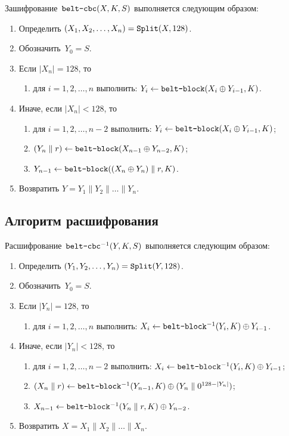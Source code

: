 Зашифрование~$\texttt{belt-cbc}(X,K,S)$ выполняется следующим образом: 
\begin{enumerate}
\item
Определить $(X_1,X_2,\ldots,X_n)=\mathop{\texttt{Split}}\nolimits(X,128)$.
\item
Обозначить~$Y_0=S$.
\item
Если $|X_n|=128$, то
\begin{enumerate}
\item
для $i=1,2,\ldots,n$ выполнить: 
$Y_i\leftarrow \texttt{belt-block}(X_i\oplus Y_{i-1},K)$.
\end{enumerate}
\item
Иначе, если $|X_n|<128$, то
\begin{enumerate}
\item
для $i=1,2,\ldots,n-2$ выполнить: 
$Y_i\leftarrow \texttt{belt-block}(X_i\oplus Y_{i-1},K)$;
\item
$(Y_n\parallel r)\leftarrow \texttt{belt-block}(X_{n-1}\oplus Y_{n-2},K)$;
\item
$Y_{n-1}\leftarrow \texttt{belt-block}((X_n\oplus Y_n)\parallel r,K)$.
\end{enumerate}
\item
Возвратить
$Y=Y_1\parallel Y_2\parallel\ldots\parallel Y_n$.
\end{enumerate}

\subsection{Алгоритм расшифрования}

Расшифрование~$\texttt{belt-cbc}^{-1}(Y,K,S)$ выполняется следующим образом: 
\begin{enumerate}
\item
Определить $(Y_1,Y_2,\ldots,Y_n)=\mathop{\texttt{Split}}\nolimits(Y,128)$.
\item
Обозначить~$Y_0=S$.
\item
Если $|Y_n|=128$, то
\begin{enumerate}
\item
для $i=1,2,\ldots,n$ выполнить: 
$X_i\leftarrow \texttt{belt-block}^{-1}(Y_i,K)\oplus Y_{i-1}$.
\end{enumerate}
\item
Иначе, если $|Y_n|<128$, то
\begin{enumerate}
\item
для $i=1,2,\ldots,n-2$ выполнить: 
$X_i\leftarrow \texttt{belt-block}^{-1}(Y_i,K)\oplus Y_{i-1}$;
\item
$(X_n\parallel r)\leftarrow \texttt{belt-block}^{-1}(Y_{n-1},K)\oplus 
(Y_n\parallel 0^{128-|Y_n|})$;
\item
$X_{n-1}\leftarrow \texttt{belt-block}^{-1}(Y_n\parallel r,K)\oplus Y_{n-2}$.
\end{enumerate}
\item
Возвратить
$X=X_1\parallel X_2\parallel\ldots\parallel X_n$.
\end{enumerate}
